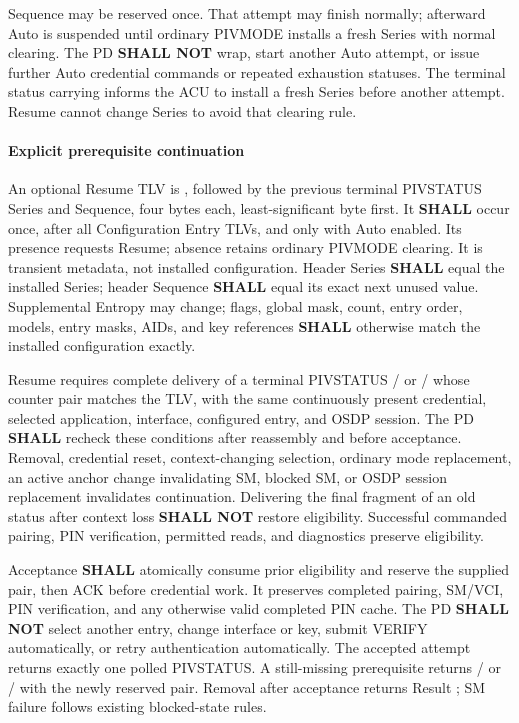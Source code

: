 Sequence  may be reserved once. That attempt may finish normally; afterward
Auto is suspended until ordinary PIVMODE installs a fresh Series with normal clearing.
The PD \textbf{SHALL NOT} wrap, start another Auto attempt, or issue further Auto credential
commands or repeated exhaustion statuses. The terminal status carrying 
informs the ACU to install a fresh Series before another attempt. Resume cannot change Series
to avoid that clearing rule.

\paragraph{Explicit prerequisite continuation}\label{sec:pivauto-resume}
An optional Resume TLV is , followed by the previous terminal PIVSTATUS Series
and Sequence, four bytes each, least-significant byte first. It \textbf{SHALL} occur once,
after all Configuration Entry TLVs, and only with Auto enabled. Its presence requests Resume;
absence retains ordinary PIVMODE clearing. It is transient metadata, not installed
configuration. Header Series \textbf{SHALL} equal the installed Series; header Sequence
\textbf{SHALL} equal its exact next unused value. Supplemental Entropy may change; flags,
global mask, count, entry order, models, entry masks, AIDs, and key references \textbf{SHALL}
otherwise match the installed configuration exactly.

Resume requires complete delivery of a terminal PIVSTATUS / or
/ whose counter pair matches the TLV, with the same continuously present
credential, selected application, interface, configured entry, and OSDP session. The PD
\textbf{SHALL} recheck these conditions after reassembly and before acceptance. Removal,
credential reset, context-changing selection, ordinary mode replacement, an active anchor
change invalidating SM, blocked SM, or OSDP session replacement invalidates continuation.
Delivering the final fragment of an old status after context loss \textbf{SHALL NOT} restore
eligibility. Successful commanded pairing, PIN verification, permitted reads, and diagnostics
preserve eligibility.

Acceptance \textbf{SHALL} atomically consume prior eligibility and reserve the supplied pair,
then ACK before credential work. It preserves completed pairing, SM/VCI, PIN verification,
and any otherwise valid completed PIN cache. The PD \textbf{SHALL NOT} select another entry,
change interface or key, submit VERIFY automatically, or retry authentication automatically.
The accepted attempt returns exactly one polled PIVSTATUS. A still-missing prerequisite
returns / or / with the newly reserved pair.
Removal after acceptance returns Result ; SM failure follows existing blocked-state
rules.

